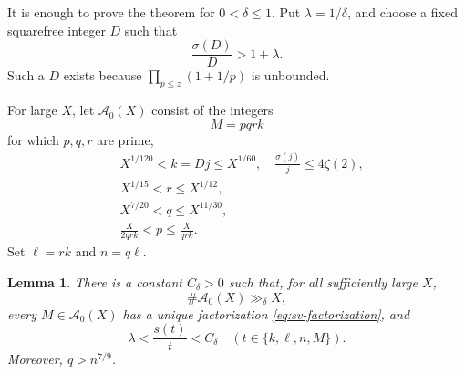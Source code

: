 \documentclass[11pt,letterpaper,reqno]{amsart}
\numberwithin{equation}{section}
\newtheorem{lemma}[theorem]{Lemma}
\theoremstyle{remark}
\newcommand{\1}{\mathbf 1}
\renewcommand{\leq}{\leqslant}
\begin{document}
It is enough to prove the theorem for $0<\delta\leq1$. Put
$\lambda=1/\delta$, and choose a fixed squarefree integer $D$ such that
\begin{equation}\label{eq:sv-D}
 \frac{\sigma(D)}D>1+\lambda.
\end{equation}
Such a $D$ exists because $\prod_{p\leq z}(1+1/p)$ is unbounded.

For large $X$, let $\mathcal{A}_0(X)$ consist of the integers
\begin{equation}\label{eq:sv-factorization}
 M=pqrk
\end{equation}
for which $p,q,r$ are prime,
\begin{align*}
 &X^{1/120}<k=Dj\leq X^{1/60},
 \quad \frac{\sigma(j)}j\leq4\zeta(2),\\
 &X^{1/15}<r\leq X^{1/12},\\
 &X^{7/20}<q\leq X^{11/30},\\
 &\frac{X}{2qrk}<p\leq\frac{X}{qrk}.
\end{align*}
Set $\ell=rk$ and $n=q\ell$.

\begin{lemma}
There is a constant $C_\delta>0$ such that, for all sufficiently large
$X$,
\[
 \#\mathcal{A}_0(X)\gg_\delta X,
\]
every $M\in\mathcal{A}_0(X)$ has a unique factorization
\eqref{eq:sv-factorization}, and
\begin{equation}\label{eq:sv-two-sided}
 \lambda<\frac{s(t)}t<C_\delta
 \quad(t\in\{k,\ell,n,M\}).
\end{equation}
Moreover, $q>n^{7/9}$.
\end{lemma}
\end{document}

